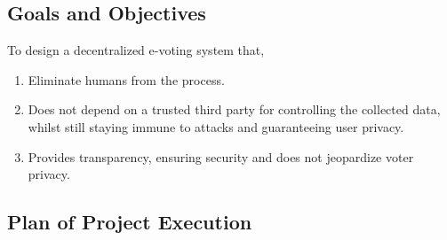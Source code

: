 \documentclass[oneside, 12pt]{book}
\begin{document}
		\subsection{Goals and Objectives}
			To design a decentralized e-voting system that,
			\begin{enumerate}
				\item Eliminate humans from the process.
				\item Does not depend on a trusted third party for controlling the collected data, whilst still staying immune to attacks and guaranteeing user privacy.
				\item Provides transparency, ensuring security and does not jeopardize voter privacy.
			\end{enumerate}
		\subsection{Plan of Project Execution}
\end{document}
